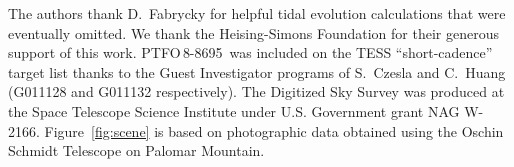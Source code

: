\documentclass[12pt,twocolumn,tighten]{aastex62}
\newcommand{\ptfo}{PTFO$\,$8-8695}
\begin{document}
\acknowledgements
%
%
%
The authors thank D.~Fabrycky for helpful tidal evolution calculations
that were eventually omitted.
%
We thank the Heising-Simons Foundation for their generous support of this work.
%
\ptfo\ was included on the TESS ``short-cadence'' target list thanks to the
Guest Investigator programs of S.\ Czesla and C.\ Huang (G011128 and
G011132 respectively).
%
The Digitized Sky Survey was produced at the Space Telescope Science
Institute under U.S. Government grant NAG W-2166.
Figure~\ref{fig:scene} is based on photographic data obtained using
the Oschin Schmidt Telescope on Palomar Mountain.
%
%
%
%
\end{document}
